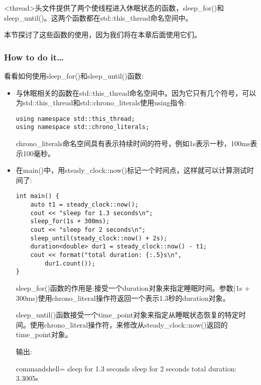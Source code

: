 
<thread>头文件提供了两个使线程进入休眠状态的函数，sleep\_for()和sleep\_until()。这两个函数都在std::this\_thread命名空间中。

本节探讨了这些函数的使用，因为我们将在本章后面使用它们。

\subsubsection{How to do it…}

看看如何使用sleep\_for()和sleep\_until()函数:

\begin{itemize}
\item 
与休眠相关的函数在std::this\_thread命名空间中。因为它只有几个符号，可以为std::this\_thread和std::chrono\_literals使用using指令:

\begin{lstlisting}[style=styleCXX]
using namespace std::this_thread;
using namespace std::chrono_literals;
\end{lstlisting}

chrono\_literals命名空间具有表示持续时间的符号，例如1s表示一秒，100ms表示100毫秒。

\item 
在main()中，用steady\_clock::now()标记一个时间点，这样就可以计算测试时间了:

\begin{lstlisting}[style=styleCXX]
int main() {
	auto t1 = steady_clock::now();
	cout << "sleep for 1.3 seconds\n";
	sleep_for(1s + 300ms);
	cout << "sleep for 2 seconds\n";
	sleep_until(steady_clock::now() + 2s);
	duration<double> dur1 = steady_clock::now() - t1;
	cout << format("total duration: {:.5}s\n",
		dur1.count());
}
\end{lstlisting}

sleep\_for()函数的作用是:接受一个duration对象来指定睡眠时间。参数(1s + 300ms)使用chrono\_literal操作符返回一个表示1.3秒的duration对象。

sleep\_until()函数接受一个time\_point对象来指定从睡眠状态恢复的特定时间。使用chrono\_literal操作符，来修改从steady\_clock::now()返回的time\_point对象。

输出:

\begin{tcblisting}{commandshell={}}
sleep for 1.3 seconds
sleep for 2 seconds
total duration: 3.3005s
\end{tcblisting}

\end{itemize}

